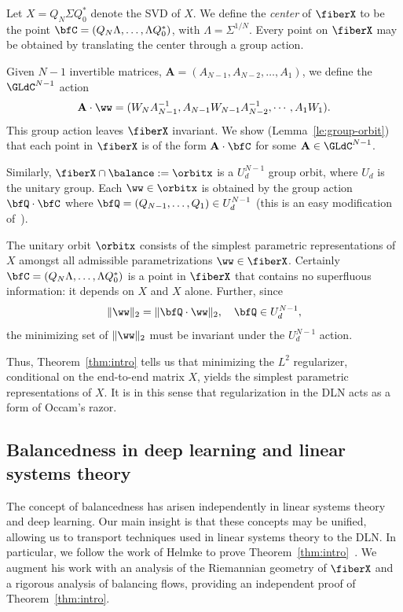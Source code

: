 Let $X = Q_N\Sigma Q_0^*$ denote the SVD of $X$. We define the {\em center\/} of $\fiberX$ to be the point $\bfC= (Q_N\Lambda,\ldots,\Lambda Q_0^*)$, with $\Lambda=\Sigma^{1/N}$.  Every point on $\fiberX$ may be obtained by translating the center through a group action. 

Given $N-1$ invertible matrices, $\mathbf{A}=(A_{N-1},A_{N-2},\ldots, A_1)$, we define the $\GLdC^{N-1}$ action 
\begin{equation}
    \label{eq:group-action1}
    \mathbf{A}\cdot \ww = (W_N A_{N-1}^{-1}, A_{N-1}W_{N-1}A_{N-2}^{-1}, \cdots, A_1 W_1).
\end{equation}               
This group action leaves $\fiberX$ invariant. We show (Lemma~\ref{le:group-orbit}) that each point in $\fiberX$ is of the form $\mathbf{A}\cdot \bfC$ for some $\mathbf{A} \in \GLdC^{N-1}$. 

Similarly, $\fiberX \cap \balance:=\orbitx$  is a $U_d^{N-1}$ group orbit, where $U_d$ is the unitary group. Each $\ww \in\orbitx$ is obtained by the group action $\bfQ\cdot \bfC$ where $\bfQ=(Q_{N-1},\ldots,Q_1)\in U_d^{N-1}$ (this is an easy modification of~\cite[\S 4]{MY-dln}).

The unitary orbit $\orbitx$ consists of the simplest parametric representations of $X$ amongst all admissible parametrizations $\ww \in \fiberX$. Certainly $\bfC= (Q_N \Lambda,\ldots,\Lambda Q_0^*)$ is a point in $\fiberX$ that contains no superfluous information: it depends on $X$ and $X$ alone. Further, since  
\begin{equation}
    \label{eq:group-action2}
    \|\ww\|_2 = \|\bfQ \cdot \ww\|_2, \quad \bfQ \in U_d^{N-1},
\end{equation} 
the minimizing set of $\|\ww\|_2$ must be invariant under  the $U_d^{N-1}$ action. 

Thus, Theorem~\ref{thm:intro} tells us that minimizing the $L^2$ regularizer, conditional on the end-to-end matrix $X$, yields the simplest parametric representations of $X$. It is in this sense that regularization in the DLN acts as a form of Occam's razor. 

\subsection{Balancedness in deep learning and linear systems theory}
\label{subsec:ls}
The concept of balancedness has arisen independently in linear systems theory and deep learning. Our main insight is that these concepts may be unified, allowing us to transport techniques used in linear systems theory to the DLN. In particular, we follow the work of Helmke to prove Theorem~\ref{thm:intro}~\cite{Helmke}. We augment his work with an analysis of the Riemannian geometry of $\fiberX$ and a rigorous analysis of balancing flows, providing an independent proof of Theorem~\ref{thm:intro}.


